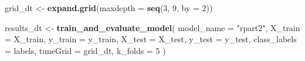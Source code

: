 \documentclass[
]{article}
\newenvironment{Shaded}{\begin{snugshade}}{\end{snugshade}}
\newcommand{\AttributeTok}[1]{\textcolor[rgb]{0.13,0.29,0.53}{#1}}
\newcommand{\DecValTok}[1]{\textcolor[rgb]{0.00,0.00,0.81}{#1}}
\newcommand{\FunctionTok}[1]{\textcolor[rgb]{0.13,0.29,0.53}{\textbf{#1}}}
\newcommand{\NormalTok}[1]{#1}
\newcommand{\OtherTok}[1]{\textcolor[rgb]{0.56,0.35,0.01}{#1}}
\newcommand{\StringTok}[1]{\textcolor[rgb]{0.31,0.60,0.02}{#1}}
\begin{document}
\begin{Shaded}
\begin{Highlighting}[]
\NormalTok{grid\_dt }\OtherTok{\textless{}{-}} \FunctionTok{expand.grid}\NormalTok{(}\AttributeTok{maxdepth =} \FunctionTok{seq}\NormalTok{(}\DecValTok{3}\NormalTok{, }\DecValTok{9}\NormalTok{, }\AttributeTok{by =} \DecValTok{2}\NormalTok{))}

\NormalTok{results\_dt }\OtherTok{\textless{}{-}} \FunctionTok{train\_and\_evaluate\_model}\NormalTok{(}
  \AttributeTok{model\_name =} \StringTok{"rpart2"}\NormalTok{,}
  \AttributeTok{X\_train =}\NormalTok{ X\_train,}
  \AttributeTok{y\_train =}\NormalTok{ y\_train,}
  \AttributeTok{X\_test =}\NormalTok{ X\_test,}
  \AttributeTok{y\_test =}\NormalTok{ y\_test,}
  \AttributeTok{class\_labels =}\NormalTok{ labels,}
  \AttributeTok{tuneGrid =}\NormalTok{ grid\_dt,}
  \AttributeTok{k\_folds =} \DecValTok{5}
\NormalTok{)}
\end{Highlighting}
\end{Shaded}
\end{document}
